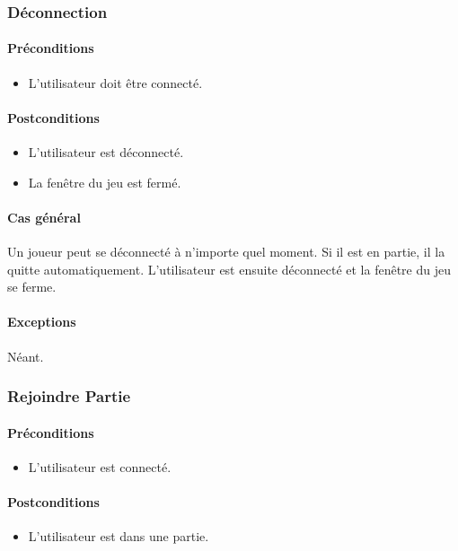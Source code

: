 \documentclass[a4paper,11pt]{report}
\begin{document}
\subsubsection{Déconnection}
\paragraph{Préconditions}
\begin{itemize}
 \item L'utilisateur doit être connecté.
\end{itemize}
\paragraph{Postconditions}
\begin{itemize}
 \item L'utilisateur est déconnecté.
 \item La fenêtre du jeu est fermé.
\end{itemize}
\paragraph{Cas général}
Un joueur peut se déconnecté à n'importe quel moment. Si il est en partie, il la quitte automatiquement. L'utilisateur
est ensuite déconnecté et la fenêtre du jeu se ferme.
\paragraph{Exceptions} Néant.
\subsubsection{Rejoindre Partie}
\paragraph{Préconditions}
\begin{itemize}
 \item L'utilisateur est connecté.
\end{itemize}
\paragraph{Postconditions}
\begin{itemize}
 \item L'utilisateur est dans une partie.
\end{itemize}
\end{document}
